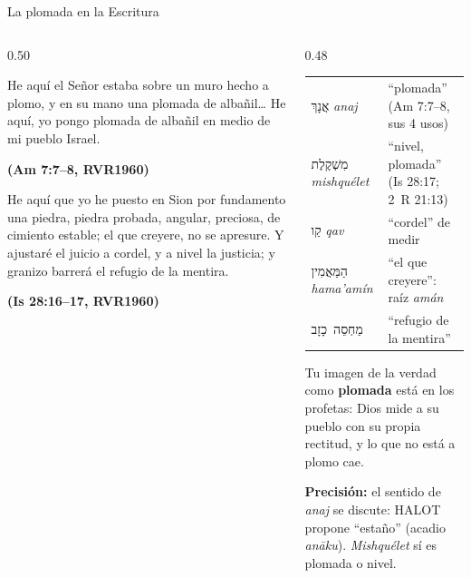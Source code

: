 \documentclass[hyperref={bookmarks=false},aspectratio=169]{beamer}
\newcommand{\heb}[1]{\mbox{\foreignlanguage{hebrew}{#1}}}
\newcommand{\fuente}[1]{\par\hfill{\upshape\bfseries\footnotesize\textcolor{azul}{#1}}}
\newcommand{\destacar}[1]{\textbf{\textcolor{azul}{#1}}}
\newcommand{\precision}[1]{{\footnotesize\color{gris}\textbf{Precisión:} #1}}
\begin{document}
\begin{frame}{La plomada en la Escritura}
\begin{columns}[t,onlytextwidth]
\begin{column}{0.50\textwidth}
\begin{cita}He aquí el Señor estaba sobre un muro hecho a plomo, y en su mano una plomada de albañil\ldots{} He aquí, yo pongo plomada de albañil en medio de mi pueblo Israel.\fuente{(Am 7:7--8, RVR1960)}\end{cita}
\begin{cita}He aquí que yo he puesto en Sion por fundamento una piedra, piedra probada, angular, preciosa, de cimiento estable; el que creyere, no se apresure. Y ajustaré el juicio a cordel, y a nivel la justicia; y granizo barrerá el refugio de la mentira.\fuente{(Is 28:16--17, RVR1960)}\end{cita}
\end{column}
\begin{column}{0.48\textwidth}
\scriptsize\renewcommand{\arraystretch}{1.12}
\begin{tabular}{@{}>{\RaggedRight\arraybackslash}p{1.9cm}>{\RaggedRight\arraybackslash}p{3.5cm}@{}}
\toprule
\heb{אֲנָךְ} \emph{anaj} & ``plomada'' (Am 7:7--8, sus 4 usos) \\
\heb{מִשְׁקֶלֶת} \emph{mishquélet} & ``nivel, plomada'' (Is 28:17; 2~R 21:13) \\
\heb{קַו} \emph{qav} & ``cordel'' de medir \\
\heb{הַמַּאֲמִין} \emph{hama'amín} & ``el que creyere'': raíz \emph{amán} \\
\heb{מַחְסֵה כָזָב} & ``refugio de la mentira'' \\
\bottomrule
\end{tabular}\par\medskip
\small Tu imagen de la verdad como \destacar{plomada} está en los profetas: Dios mide a su pueblo con su propia rectitud, y lo que no está a plomo cae.\par\smallskip
\precision{el sentido de \emph{anaj} se discute: HALOT propone ``estaño'' (acadio \emph{anāku}). \emph{Mishquélet} sí es plomada o nivel.}
\end{column}
\end{columns}
\end{frame}
\end{document}
